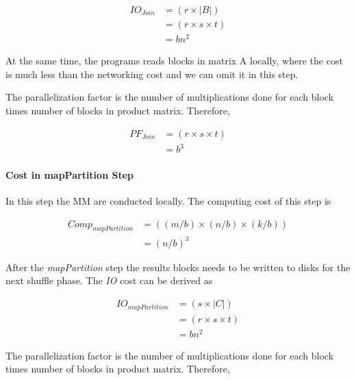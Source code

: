 \begin{equation}
    \begin{aligned}
        IO_{Join}&=(r\times \left | B \right |) \\
        &=(r\times s\times t) \\
        &=bn^{2}
    \end{aligned}
\end{equation}

At the same time, the programs reads blocks in matrix A locally, where the cost is much less than the networking cost and we can omit it in this step.

The parallelization factor is the number of multiplications done for each block times number of blocks in product matrix. Therefore,

\begin{equation}
    \begin{aligned}
        PF_{Join}&=(r\times s\times t) \\
        &=b^{3}
    \end{aligned}
\end{equation}

\paragraph{Cost in mapPartition Step}
In this step the MM are conducted locally. The computing cost of this step is

\begin{equation}
    \begin{aligned}
        Comp_{mapPartition}&=((m/b)\times (n/b)\times (k/b)) \\
        &=(n/b)^{3}
    \end{aligned}
\end{equation}

After the \textit{mapPartition} step the results blocks needs to be written to disks for the next shuffle phase. The \textit{IO} cost can be derived as

\begin{equation}
    \begin{aligned}
        IO_{mapPartition}&=(s\times \left | C \right |) \\
        &=(r\times s\times t) \\
        &=bn^{2}
    \end{aligned}
\end{equation}

The parallelization factor is the number of multiplications done for each block times number of blocks in product matrix. Therefore,

